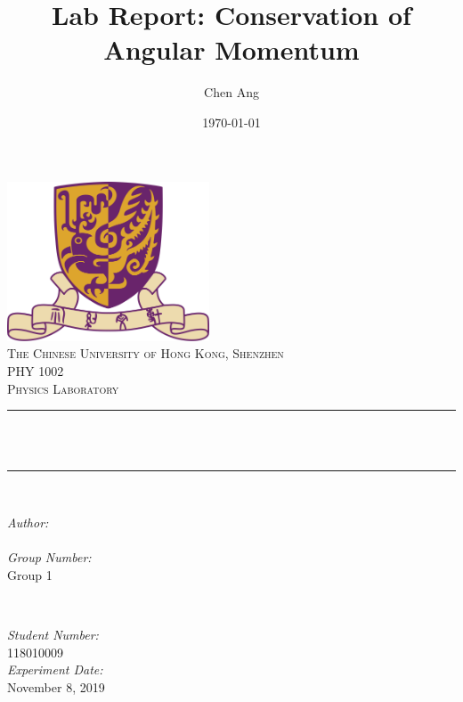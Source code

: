 \documentclass[12pt]{article}
\title{Lab Report: Conservation of Angular Momentum}                             %
\author{Chen Ang}                               %
\date{\today}                                           %
\makeatletter
\let\thetitle\@title
\let\theauthor\@author
\let\thedate\@date
\makeatother
\begin{document}

\begin{titlepage}
    \centering
    \vspace*{0.5 cm}
    \includegraphics[scale = 0.75,width=6cm]{CUHK}\\[1.0 cm]   %
    \textsc{\large The Chinese University of Hong Kong, Shenzhen}\\[2.0 cm]   %
    \textsc{\Large PHY 1002}\\[0.5 cm]               %
    \textsc{\large Physics Laboratory}\\[0.5 cm]               %
    \rule{\linewidth}{0.2 mm} \\[0.4 cm]
    { \huge \bfseries \thetitle}\\
    \rule{\linewidth}{0.2 mm} \\[1.5 cm]
    
    \begin{minipage}{0.4\textwidth}
        \begin{flushleft} \large
            \emph{Author:}\\
            \theauthor
            \\
            \emph{Group Number:} \\
            Group 1
            \end{flushleft}
            \end{minipage}~
            \begin{minipage}{0.4\textwidth}
            \begin{flushright} \large
            \emph{Student Number:} \\
            118010009                                   %
            \\
            \emph{Experiment Date:}\\
            November 8, 2019
        \end{flushright}
    \end{minipage}\\[2 cm]
    
    {\large \thedate}\\[2 cm]
 
    \vfill
    
\end{titlepage}


\tableofcontents
\pagebreak


\end{document}
